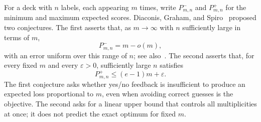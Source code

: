 \documentclass[11pt,reqno]{amsart}
\numberwithin{equation}{section}
\theoremstyle{remark}
\theoremstyle{definition}
\begin{document}
For a deck with $n$ labels, each appearing $m$ times, write $P^-_{m,n}$ and $P^+_{m,n}$ for the minimum and maximum expected scores. Diaconis, Graham, and Spiro~\cite[Conjectures~1 and~2]{DGS} proposed two conjectures. The first asserts that, as $m\to\infty$ with $n$ sufficiently large in terms of $m$,
\[
 P^-_{m,n}=m-o(m),
\]
with an error uniform over this range of $n$; see also~\cite[Conjecture~4.5]{DGHS}. The second asserts that, for every fixed $m$ and every $\varepsilon>0$, sufficiently large $n$ satisfies
\[
 P^+_{m,n}\le(e-1)m+\varepsilon.
\]
The first conjecture asks whether yes/no feedback is insufficient to produce an expected loss proportional to $m$, even when avoiding correct guesses is the objective. The second asks for a linear upper bound that controls all multiplicities at once; it does not predict the exact optimum for fixed $m$.
\end{document}
